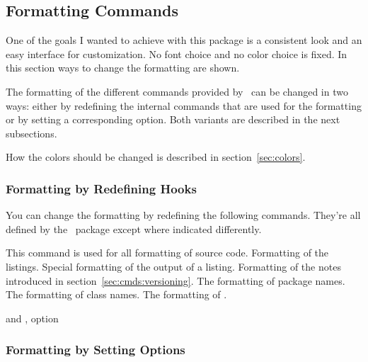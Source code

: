 \documentclass[load-preamble]{cnltx-doc}
\begin{document}
\subsection{Formatting Commands}\label{sec:cmds:formatting}

One of the goals I wanted to achieve with this package is a consistent look
and an easy interface for customization.  No font choice and no color choice
is fixed.  In this section ways to change the formatting are shown.

The formatting of the different commands provided by \cnltx\ can be
changed in two ways: either by redefining the internal commands that are used
for the formatting or by setting a corresponding option.  Both variants are
described in the next subsections.

How the colors should be changed is described in section~\ref{sec:colors}.

\subsubsection{Formatting by Redefining Hooks}

You can change the formatting by redefining the following commands.  They're
all defined by the \cnltx\ package except where indicated differently.

\begin{commands}
    This command is used for all formatting of source code.
    Formatting of the listings.
  \Default
    Special formatting of the output of a listing.
    \byclass Formatting of the notes introduced in section~\ref{sec:cmds:versioning}.
    The formatting of package names.
    The formatting of class names.
    The formatting of .
\end{commands}

\begin{example}
  \renewcommand*\codefont{\sffamily\bfseries}
   and , option 
\end{example}

\subsubsection{Formatting by Setting Options}
\end{document}
